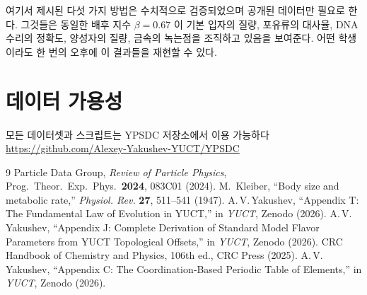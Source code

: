 \documentclass[12pt,a4paper]{article}
\begin{document}
	여기서 제시된 다섯 가지 방법은 수치적으로 검증되었으며 공개된 데이터만 필요로 한다. 그것들은 동일한 배후 지수 \(\beta = 0.67\) 이 기본 입자의 질량, 포유류의 대사율, DNA 수리의 정확도, 양성자의 질량, 금속의 녹는점을 조직하고 있음을 보여준다. 어떤 학생이라도 한 번의 오후에 이 결과들을 재현할 수 있다.
	
	\section*{데이터 가용성}
	모든 데이터셋과 스크립트는 YPSDC 저장소에서 이용 가능하다\\
	\url{https://github.com/Alexey-Yakushev-YUCT/YPSDC}
	
	\begin{thebibliography}{9}
		 Particle Data Group, \emph{Review of Particle Physics},
		Prog.\ Theor.\ Exp.\ Phys.\ \textbf{2024}, 083C01 (2024).
		 M.~Kleiber, ``Body size and metabolic rate,''
		\emph{Physiol. Rev.} \textbf{27}, 511--541 (1947).
		 A.\,V.\,Yakushev, ``Appendix T: The Fundamental Law
		of Evolution in YUCT,'' in \emph{YUCT}, Zenodo (2026).
		 A.\,V.\,Yakushev, ``Appendix J: Complete Derivation of
		Standard Model Flavor Parameters from YUCT Topological
		Offsets,'' in \emph{YUCT}, Zenodo (2026).
		 CRC Handbook of Chemistry and Physics, 106th ed.,
		CRC Press (2025).
		 A.\,V.\,Yakushev, ``Appendix C: The Coordination‑Based
		Periodic Table of Elements,'' in \emph{YUCT}, Zenodo (2026).
	\end{thebibliography}
	
\end{document}
